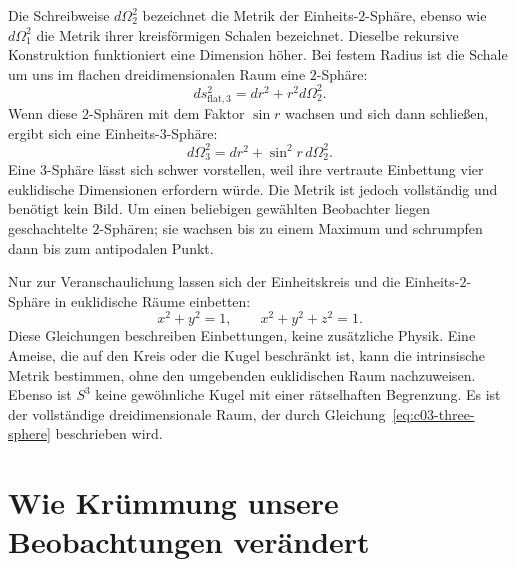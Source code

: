 Die Schreibweise \(d\Omega_2^2\) bezeichnet die Metrik der Einheits-\(2\)-Sphäre, ebenso wie \(d\Omega_1^2\) die Metrik ihrer kreisförmigen Schalen bezeichnet. Dieselbe rekursive Konstruktion funktioniert eine Dimension höher. Bei festem Radius ist die Schale um uns im flachen dreidimensionalen Raum eine \(2\)-Sphäre:
\begin{equation}
ds_{\text{flat},3}^2 = dr^2 + r^2 d\Omega_2^2.
\label{eq:c03-flat-three-polar}
\end{equation}
Wenn diese \(2\)-Sphären mit dem Faktor \(\sin r\) wachsen und sich dann schließen, ergibt sich eine Einheits-\(3\)-Sphäre:
\begin{equation}
d\Omega_3^2 = dr^2 + \sin^2 r\, d\Omega_2^2.
\label{eq:c03-three-sphere}
\end{equation}
Eine \(3\)-Sphäre lässt sich schwer vorstellen, weil ihre vertraute Einbettung vier euklidische Dimensionen erfordern würde. Die Metrik ist jedoch vollständig und benötigt kein Bild. Um einen beliebigen gewählten Beobachter liegen geschachtelte \(2\)-Sphären; sie wachsen bis zu einem Maximum und schrumpfen dann bis zum antipodalen Punkt.

\begin{classroomqa}\end{classroomqa}

Nur zur Veranschaulichung lassen sich der Einheitskreis und die Einheits-\(2\)-Sphäre in euklidische Räume einbetten:
\begin{equation}
x^2+y^2=1,
\qquad
x^2+y^2+z^2=1.
\end{equation}
Diese Gleichungen beschreiben Einbettungen, keine zusätzliche Physik. Eine Ameise, die auf den Kreis oder die Kugel beschränkt ist, kann die intrinsische Metrik bestimmen, ohne den umgebenden euklidischen Raum nachzuweisen. Ebenso ist \(S^3\) keine gewöhnliche Kugel mit einer rätselhaften Begrenzung. Es ist der vollständige dreidimensionale Raum, der durch Gleichung~\eqref{eq:c03-three-sphere} beschrieben wird.

\section{Wie Krümmung unsere Beobachtungen verändert}

